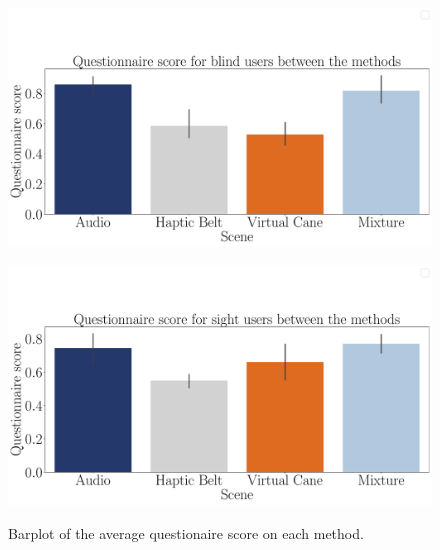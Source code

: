 \begin{figure}[!htb]
    \centering
    \begin{minipage}{\textwidth}
        \centering
        \includegraphics[width = \textwidth]{Resultados/Questionario/Figuras/pdf/barplot_questionnaire_scene_blind.pdf}
        \label{fig:barplot_questionnaire_scene_blind_2}
    \end{minipage}
    \begin{minipage}{\textwidth}
        \centering
        \includegraphics[width = \textwidth]{Resultados/Questionario/Figuras/pdf/barplot_questionnaire_scene_sight.pdf}
        \label{fig:barplot_questionnaire_scene_sight}
    \end{minipage}
    \caption{Barplot of the average questionaire score on each method.}
    \label{fig:barplot_questionnaire_scene_blind_sight}
\end{figure}


